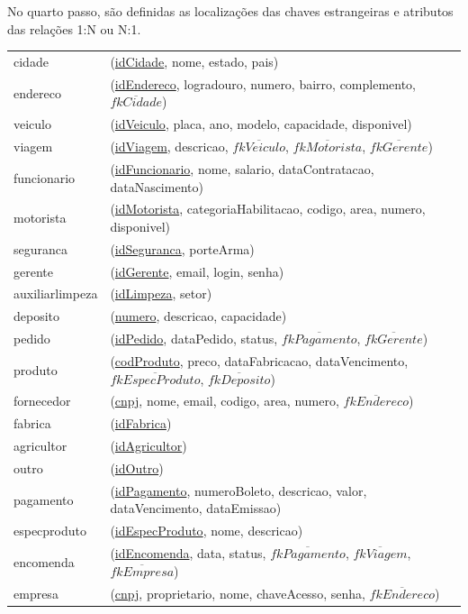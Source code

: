 \documentclass[12pt, onecolumn, titlepage]{article}
\begin{document}
\newpage
No quarto passo, são definidas as localizações das chaves estrangeiras e atributos das relações 1:N ou N:1.

\begin{table}[htb!]
\begin{center}
\begin{tabular}{p{2.5cm} p{10.5cm}}
cidade & (\underline{idCidade}, nome, estado, pais) \\
endereco & (\underline{idEndereco}, logradouro, numero, bairro, complemento, $\overline{fkCidade}$) \\
veiculo & (\underline{idVeiculo}, placa, ano, modelo, capacidade, disponivel) \\
viagem & (\underline{idViagem}, descricao, $\overline{fkVeiculo}$, $\overline{fkMotorista}$, $\overline{fkGerente}$) \\
funcionario & (\underline{idFuncionario}, nome, salario, dataContratacao, dataNascimento)\\
motorista & (\underline{idMotorista}, categoriaHabilitacao, codigo, area, numero, disponivel)\\
seguranca & (\underline{idSeguranca}, porteArma)\\
gerente & (\underline{idGerente}, email, login, senha)\\
auxiliarlimpeza & (\underline{idLimpeza}, setor)\\
deposito & (\underline{numero}, descricao, capacidade)\\
pedido & (\underline{idPedido}, dataPedido, status, $\overline{fkPagamento}$, $\overline{fkGerente}$)\\
produto & (\underline{codProduto}, preco, dataFabricacao, dataVencimento, $\overline{fkEspecProduto}$, $\overline{fkDeposito}$)\\
fornecedor & (\underline{cnpj}, nome, email, codigo, area, numero, $\overline{fkEndereco}$)\\
fabrica & (\underline{idFabrica})\\
agricultor & (\underline{idAgricultor})\\
outro & (\underline{idOutro})\\
pagamento & (\underline{idPagamento}, numeroBoleto, descricao, valor, dataVencimento, dataEmissao)\\
especproduto & (\underline{idEspecProduto}, nome, descricao)\\
encomenda & (\underline{idEncomenda}, data, status, $\overline{fkPagamento}$, $\overline{fkViagem}$, $\overline{fkEmpresa}$)\\
empresa & (\underline{cnpj}, proprietario, nome, chaveAcesso, senha, $\overline{fkEndereco}$)
\end{tabular}
\end{center}
\end{table}
\end{document}
